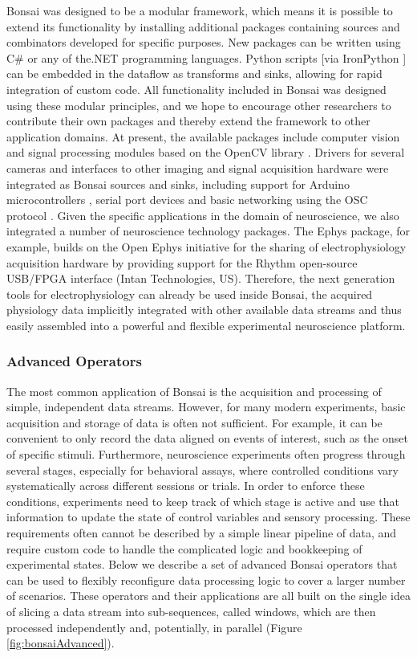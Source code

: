 Bonsai was designed to be a modular framework, which means it is possible to extend its functionality by installing additional packages containing sources and combinators developed for specific purposes. New packages can be written using C\# or any of the.NET programming languages. Python scripts [via IronPython \cite{IronPython2014}] can be embedded in the dataflow as transforms and sinks, allowing for rapid integration of custom code. All functionality included in Bonsai was designed using these modular principles, and we hope to encourage other researchers to contribute their own packages and thereby extend the framework to other application domains. At present, the available packages include computer vision and signal processing modules based on the OpenCV library \cite{Itseez2014}. Drivers for several cameras and interfaces to other imaging and signal acquisition hardware were integrated as Bonsai sources and sinks, including support for Arduino microcontrollers \cite{Banzi2014}, serial port devices and basic networking using the OSC protocol \cite{Wright2003}. Given the specific applications in the domain of neuroscience, we also integrated a number of neuroscience technology packages. The Ephys package, for example, builds on the Open Ephys initiative for the sharing of electrophysiology acquisition hardware \cite{Voigts2013} by providing support for the Rhythm open-source USB/FPGA interface (Intan Technologies, US). Therefore, the next generation tools for electrophysiology can already be used inside Bonsai, the acquired physiology data implicitly integrated with other available data streams and thus easily assembled into a powerful and flexible experimental neuroscience platform.

\subsubsection{Advanced Operators}

The most common application of Bonsai is the acquisition and processing of simple, independent data streams. However, for many modern experiments, basic acquisition and storage of data is often not sufficient. For example, it can be convenient to only record the data aligned on events of interest, such as the onset of specific stimuli. Furthermore, neuroscience experiments often progress through several stages, especially for behavioral assays, where controlled conditions vary systematically across different sessions or trials. In order to enforce these conditions, experiments need to keep track of which stage is active and use that information to update the state of control variables and sensory processing. These requirements often cannot be described by a simple linear pipeline of data, and require custom code to handle the complicated logic and bookkeeping of experimental states. Below we describe a set of advanced Bonsai operators that can be used to flexibly reconfigure data processing logic to cover a larger number of scenarios. These operators and their applications are all built on the single idea of slicing a data stream into sub-sequences, called windows, which are then processed independently and, potentially, in parallel (Figure \ref{fig:bonsaiAdvanced}).

